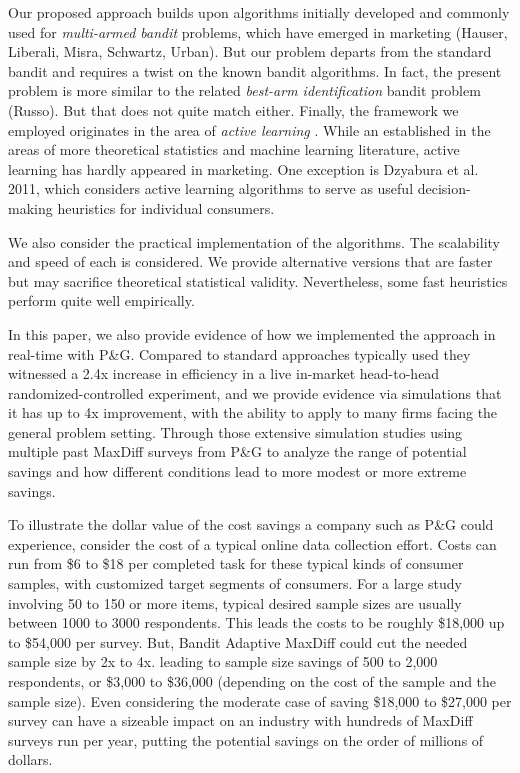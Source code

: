 \documentclass[a4paper,12pt]{article}
\begin{document}
Our proposed approach builds upon algorithms initially developed and commonly used for \emph{multi-armed bandit} problems, which have emerged in marketing (Hauser, Liberali, Misra, Schwartz, Urban). But our problem departs from the standard bandit and requires a twist on the known bandit algorithms. In fact, the present problem is more similar to the related \emph{best-arm identification} bandit problem (Russo). But that does not quite match either. Finally, the framework we employed originates in the area of \emph{active learning} \citep{balcan2009agnostic,dasgupta2008general}. While an established in the areas of  more theoretical statistics and machine learning literature, active learning has hardly appeared in marketing. One exception is Dzyabura et al. 2011, which considers active learning algorithms to serve as useful decision-making heuristics for individual consumers. 

We also consider the practical implementation of the algorithms. The scalability and speed of each is considered. We provide alternative versions that are faster but may sacrifice theoretical statistical validity. Nevertheless, some fast heuristics perform quite well empirically. 

In this paper, we also provide evidence of how we implemented the approach in real-time with P\&G. Compared to standard approaches typically used they witnessed a 2.4x increase in efficiency in a live in-market head-to-head randomized-controlled experiment, and we provide evidence via simulations that it has up to 4x improvement, with the ability to apply to many firms facing the general problem setting. Through those extensive simulation studies using multiple past MaxDiff surveys from P\&G to analyze the range of potential savings and how different conditions lead to more modest or more extreme savings. 

To illustrate the dollar value of the cost savings a company such as P\&G could experience, consider the cost of a typical online data collection effort. Costs can run from \$6 to \$18 per completed task for these typical kinds of consumer samples, with customized target segments of consumers.  For a large study involving 50 to 150 or more items, typical desired sample sizes are usually between 1000 to 3000 respondents.  This leads the costs to be roughly \$18,000 up to \$54,000 per survey. But, Bandit Adaptive MaxDiff could cut the needed sample size by 2x to 4x. leading to sample size savings of 500 to 2,000 respondents, or \$3,000 to \$36,000 (depending on the cost of the sample and the sample size). Even considering the moderate case of saving \$18,000 to \$27,000 per survey can have a sizeable impact on an industry with hundreds of MaxDiff surveys run per year, putting the potential savings on the order of millions of dollars.
\end{document}
